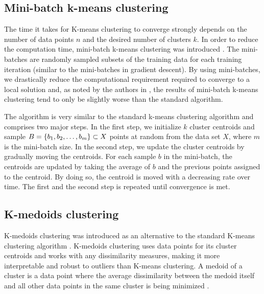 \subsection{Mini-batch k-means clustering}
\label{sec:mini-batch-k-means-clustering}
The time it takes for K-means clustering to converge strongly depends on the number of data points $n$ and the desired number of clusters $k$. In order to reduce the computation time, mini-batch k-means clustering was introduced \cite{sculley2010}. The mini-batches are randomly sampled subsets of the training data for each training iteration (similar to the mini-batches in gradient descent). By using mini-batches, we drastically reduce the computational requirement required to converge to a local solution and, as noted by the authors in \cite{sculley2010}, the results of mini-batch k-means clustering tend to only be slightly worse than the standard algorithm.

The algorithm is very similar to the standard k-means clustering algorithm and comprises two major steps. In the first step, we initialize $k$ cluster centroids and sample $B=\left\{b_1, b_2, \ldots, b_m\right\} \subset X$ points at random from the data set $X$, where $m$ is the mini-batch size. In the second step, we update the cluster centroids by gradually moving the centroids. For each sample $b$ in the mini-batch, the centroids are updated by taking the average of $b$ and the previous points assigned to the centroid. By doing so, the centroid is moved with a decreasing rate over time. The first and the second step is repeated until convergence is met.

\subsection{K-medoids clustering}
\label{sec:k-medoids-clustering}
K-medoids clustering was introduced as an alternative to the standard K-means clustering algorithm \cites{Kaufman1990}[p. 427 - 428]{bishop2006}. K-medoids clustering uses data points for its cluster centroids and works with any dissimilarity measures, making it more interpretable and robust to outliers than K-means clustering. A medoid of a cluster is a data point where the average dissimilarity between the medoid itself and all other data points in the same cluster is being minimized \cite{Kaufman1990}.

